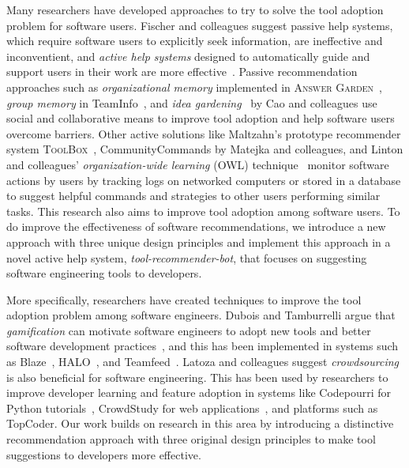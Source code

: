 \documentclass[sigconf,review,anonymous]{acmart}
\newcommand{\tool}{\textsl{tool-recommender-bot}}
\begin{document}
Many researchers have developed approaches to try to solve the tool adoption problem for software users. Fischer and colleagues suggest passive help systems, which require software users to explicitly seek information, are ineffective and inconventient, and \textit{active help systems} designed to automatically guide and support users in their work are more effective~\cite{Fischer1984ActiveHelpSystems}. Passive recommendation approaches such as \textit{organizational memory} implemented in \textsc{Answer Garden}~\cite{Ackerman1990AnswerGarden}, \textit{group memory} in TeamInfo~\cite{Berlin1993TeamInfo}, and \textit{idea gardening}~\cite{Cao2011IdeaGarden} by Cao and colleagues use social and collaborative means to improve tool adoption and help software users overcome barriers. Other active solutions like Maltzahn's prototype recommender system \textsc{ToolBox}~\cite{Maltzahn1994Toolbox}, CommunityCommands by Matejka and colleagues\cite{Matejka2009CommunityCommands}, and Linton and colleagues' \textit{organization-wide learning} (OWL) technique~\cite{Linton2000OWL} monitor software actions by users by tracking logs on networked computers or stored in a database to suggest helpful commands and strategies to other users performing similar tasks. This research also aims to improve tool adoption among software users. To do improve the effectiveness of software recommendations, we introduce a new approach with three unique design principles and implement this approach in a novel active help system, \tool, that focuses on suggesting software engineering tools to developers.

More specifically, researchers have created techniques to improve the tool adoption problem among software engineers. Dubois and Tamburrelli argue that \textit{gamification} can motivate software engineers to adopt new tools and better software development practices~\cite{Dubois2013Gamification}, and this has been implemented in systems such as Blaze~\cite{Snipes2014Blaze}, HALO~\cite{Sheth2011Halo}, and Teamfeed~\cite{Singer2012Teamfeed}. Latoza and colleagues suggest \textit{crowdsourcing} is also beneficial for software engineering\cite{Latoza2016Crowdsourcing}. This has been used by researchers to improve developer learning and feature adoption in systems like Codepourri for Python tutorials~\cite{Gordon2015Codepourri}, CrowdStudy for web applications~\cite{Nebeling2013CrowdStudy}, and platforms such as TopCoder\cite{Lakhani2010TopCoder}. Our work builds on research in this area by introducing a distinctive recommendation approach with three original design principles to make tool suggestions to developers more effective.
\end{document}
